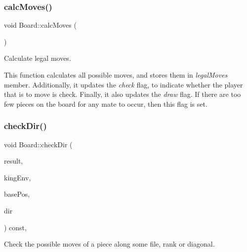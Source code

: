\subsubsection{\texorpdfstring{calc\+Moves()}{calcMoves()}}
{\footnotesize\ttfamily void Board\+::calc\+Moves (\begin{DoxyParamCaption}{ }\end{DoxyParamCaption})\hspace{0.3cm}{\ttfamily [private]}}



Calculate legal moves. 

This function calculates all possible moves, and stores them in {\itshape legal\+Moves} member. Additionally, it updates the {\itshape check} flag, to indicate whether the player that is to move is check. Finally, it also updates the {\itshape draw} flag. If there are too few pieces on the board for any mate to occur, then this flag is set. \mbox{\label{classBoard_ab63f400e8fdd7d1747c18642b59cc435}} 
\subsubsection{\texorpdfstring{check\+Dir()}{checkDir()}}
{\footnotesize\ttfamily void Board\+::check\+Dir (\begin{DoxyParamCaption}\item[{\hyperlink{structmoveArray}{move\+Array} \&}]{result,  }\item[{const \hyperlink{structcheck}{check} \&}]{king\+Env,  }\item[{const \hyperlink{structsquare}{square}$<$ int $>$}]{base\+Pos,  }\item[{const \hyperlink{structsquare}{square}$<$ int $>$}]{dir }\end{DoxyParamCaption}) const\hspace{0.3cm}{\ttfamily [inline]}, {\ttfamily [private]}}



Check the possible moves of a piece along some file, rank or diagonal. 

